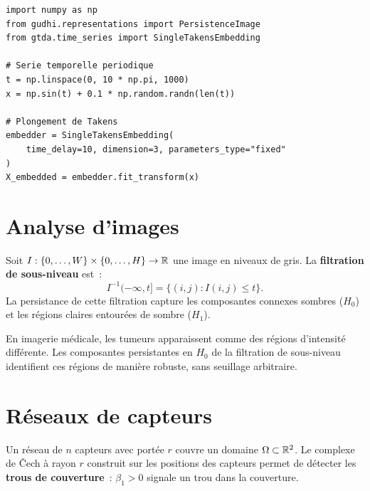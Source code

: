 \begin{verbatim}
import numpy as np
from gudhi.representations import PersistenceImage
from gtda.time_series import SingleTakensEmbedding

# Serie temporelle periodique
t = np.linspace(0, 10 * np.pi, 1000)
x = np.sin(t) + 0.1 * np.random.randn(len(t))

# Plongement de Takens
embedder = SingleTakensEmbedding(
    time_delay=10, dimension=3, parameters_type="fixed"
)
X_embedded = embedder.fit_transform(x)
\end{verbatim}

\section{Analyse d'images}
\label{sec:images}

\begin{definition}
Soit $I : \{0, \ldots, W\} \times \{0, \ldots, H\} \to \mathbb{R}$ une
image en niveaux de gris. La \textbf{filtration de sous-niveau} est~:
\[
  I^{-1}(-\infty, t] = \{(i,j) : I(i,j) \leq t\}.
\]
La persistance de cette filtration capture les composantes connexes
sombres ($H_0$) et les r\'egions claires entour\'ees de sombre ($H_1$).
\end{definition}

\begin{exemple}
En imagerie m\'edicale, les tumeurs apparaissent comme des r\'egions
d'intensit\'e diff\'erente. Les composantes persistantes en $H_0$ de
la filtration de sous-niveau identifient ces r\'egions de mani\`ere
robuste, sans seuillage arbitraire.
\end{exemple}

\section{R\'eseaux de capteurs}
\label{sec:capteurs}

\begin{definition}
Un r\'eseau de $n$ capteurs avec port\'ee $r$ couvre un domaine
$\Omega \subset \mathbb{R}^2$. Le complexe de \v{C}ech \`a rayon $r$
construit sur les positions des capteurs permet de d\'etecter
les \textbf{trous de couverture}~: $\beta_1 > 0$ signale un
trou dans la couverture.
\end{definition}

